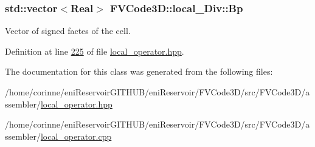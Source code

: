 \subsubsection[{\texorpdfstring{Bp}{Bp}}]{\setlength{\rightskip}{0pt plus 5cm}std\+::vector$<${\bf Real}$>$ F\+V\+Code3\+D\+::local\+\_\+\+Div\+::\+Bp\hspace{0.3cm}{\ttfamily [private]}}\hypertarget{classFVCode3D_1_1local__Div_a43a4652e156243c0f8c82af161ab0b8f}{}\label{classFVCode3D_1_1local__Div_a43a4652e156243c0f8c82af161ab0b8f}


Vector of signed factes of the cell. 



Definition at line \hyperlink{local__operator_8hpp_source_l00225}{225} of file \hyperlink{local__operator_8hpp_source}{local\+\_\+operator.\+hpp}.



The documentation for this class was generated from the following files\+:\begin{DoxyCompactItemize}
\item 
/home/corinne/eni\+Reservoir\+G\+I\+T\+H\+U\+B/eni\+Reservoir/\+F\+V\+Code3\+D/src/\+F\+V\+Code3\+D/assembler/\hyperlink{local__operator_8hpp}{local\+\_\+operator.\+hpp}\item 
/home/corinne/eni\+Reservoir\+G\+I\+T\+H\+U\+B/eni\+Reservoir/\+F\+V\+Code3\+D/src/\+F\+V\+Code3\+D/assembler/\hyperlink{local__operator_8cpp}{local\+\_\+operator.\+cpp}\end{DoxyCompactItemize}
